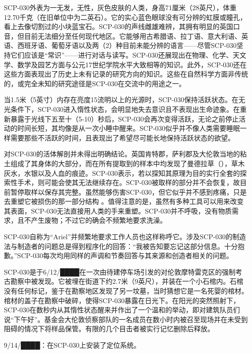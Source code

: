 SCP-030外表为一无发，无性，灰色皮肤的人类，身高71厘米（28英尺），体重12.70千克（在旧单位中为二英石）。它的实心蓝色眼球没有可分辨的虹膜或瞳孔，看上去像切割过的小块蓝宝石。SCP-030的声线雌雄难辨，其拥有明显的英国口音，但目前无法细分至任何现代地区。它能够用古希腊语、拉丁语、意大利语、英语、西班牙语、葡萄牙语以及两（2）种目前未能分辨的语言——尽管SCP-030坚持它们应该是“常识”——进行对话与读写。SCP-030还展现出在物理、化学、天文学、数学及园艺方面与公元17世纪学院水平大致相等的知识。此外，SCP-030还在这些方面表现出了历史上未有记录的研究方向的知识。这些在自然科学方面非传统的，或完全未知的研究途径是SCP-030在交流中的用途之一。

当1.5米（5英寸）内存在亮度15流明以上的光源时，SCP-030保持活跃状态。在无光条件下，SCP-030进入惰性状态，会明显地失去意识且不表现出生命迹象。在重新暴露于光线下五至十（5-10）秒后，SCP-030会再次变得活跃，无论之前停止活动的时间长短，其均像是从一次小睡中醒来。SCP-030似乎并不像人类需要睡眠一样需要那些不活跃的时间，且表现出了希望尽可能长地保持活跃状态的欲望。

对SCP-030的活体解剖并未得出明确结论。英国肯特郡，萨利郡及大伦敦当地的粘土组成了其身体的大部分，而在所有提取到的样本中均发现了曼德拉草（），草木灰水，水银以及人血的痕迹。SCP-030表示，若以探知其原理为目的实行全套的探索性手术，则可能会使其无法继续存在。SCP-030被取样的部分并不会恢复，故目前暂停取样以保存其完整。虽然能够伤害SCP-030，但它似乎并不感到疼痛，只是去重塑它被损伤的那一部分结构 。值得注意的是，虽然有多种工具可以用来改变其表面，SCP-030无法直接用人类的手来重塑。SCP-030并不呼吸，没有物质需求，且不产生废物；不过它的确会不频繁地要求洗澡。

SCP-030自称为“Ariel”并频繁地要求工作人员也这样称呼它。涉及SCP-030的制造法与制造者的问题总是得到程序化的回答：“我被告知要忘记这部分信息。十分抱歉。”SCP-030每次均用同样的声调和节奏回答与其来源和创造者相关的问题。

SCP-030是于6\slash 12\slash ████在一次由待建停车场引发的对伦敦摩特雷克区的强制考古勘察中被发现。它被埋在街道下约2.7米（9英尺），并装在一个小石棺内。石棺没有任何标记，鉴于在勘察地区发现了另一坟墓，当时猜想它是一名死婴的棺材。棺材的盖子在勘察中破碎，使得SCP-030暴露在日光下。在阳光的突然照射下，SCP-030在数秒内从其惰性状态醒来并作出了一个温和的举动，即对建筑队员们说“下午好”。基金会大伦敦侦察部队的一名成员在数小时内被召至现场并在未受到阻碍的情况下将样品保管。有限的几个目击者被实行记忆删除后释放。



9\slash 14\slash ████：在SCP-030上安装了定位系统。

